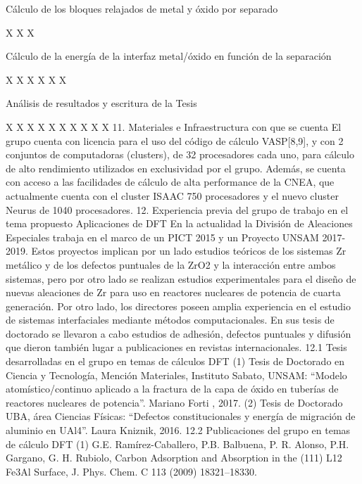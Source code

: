 Cálculo de los bloques relajados de metal y óxido por separado


X
X
X








Cálculo de la energía de la interfaz metal/óxido en función de la separación




X
X
X
X
X
X



Análisis de resultados y escritura de la Tesis



X
X
X
X
X
X
X
X
X
X
11. Materiales e Infraestructura con que se cuenta 
El grupo cuenta con licencia para el uso del código de cálculo VASP[8,9], y con 2 conjuntos de computadoras (clusters), de 32 procesadores cada uno, para cálculo de alto rendimiento utilizados en exclusividad por el grupo. Además, se cuenta con acceso a las facilidades de cálculo de alta performance de la CNEA, que actualmente cuenta con el cluster ISAAC 750 procesadores y el nuevo cluster Neurus de 1040 procesadores.
12. Experiencia previa del grupo de trabajo en el tema propuesto Aplicaciones de DFT
En la actualidad la División de Aleaciones Especiales trabaja en el marco de un PICT 2015 y un Proyecto UNSAM 2017-2019. Estos proyectos implican por un lado estudios teóricos de los sistemas Zr metálico y de los defectos puntuales de la ZrO2 y la interacción entre ambos sistemas, pero por otro lado se realizan estudios experimentales para el diseño de nuevas aleaciones de Zr para uso en reactores nucleares de potencia de cuarta generación. 
Por otro lado, los directores poseen amplia experiencia en el estudio de sistemas interfaciales mediante métodos computacionales. En sus tesis de doctorado se llevaron a cabo estudios de adhesión, defectos puntuales y difusión que dieron también lugar a publicaciones en revistas internacionales. 
12.1  Tesis desarrolladas en el grupo en temas de cálculos DFT
    (1) Tesis de Doctorado en Ciencia y Tecnología, Mención Materiales, Instituto Sabato, UNSAM: “Modelo atomístico/continuo aplicado a la fractura de la capa de óxido en tuberías de reactores nucleares de potencia”. Mariano Forti , 2017.
    (2) Tesis de Doctorado UBA, área Ciencias Físicas: “Defectos constitucionales y energía de migración de aluminio en UAl4”. Laura Kniznik, 2016. 
12.2  Publicaciones del grupo en temas de cálculo DFT
    (1)  G.E. Ramírez-Caballero, P.B. Balbuena, P. R. Alonso, P.H. Gargano, G. H. Rubiolo, Carbon Adsorption and Absorption in the (111) L12 Fe3Al Surface, J. Phys. Chem. C 113 (2009) 18321–18330.
